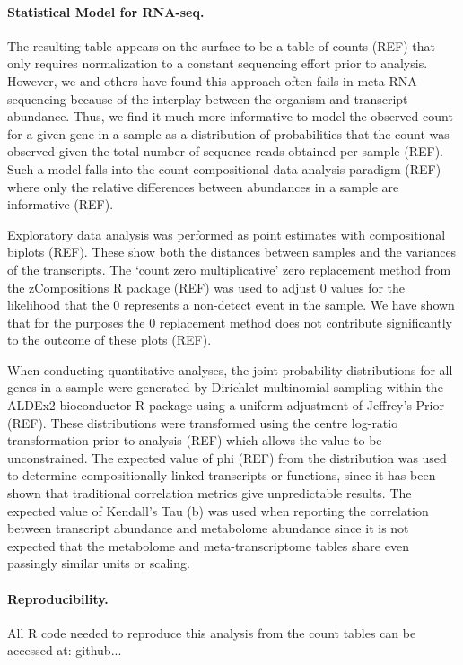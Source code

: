 \documentclass[10pt,letterpaper]{article}
\begin{document}
\paragraph{Statistical Model for RNA-seq.} The resulting table appears on the surface to be a table of counts (REF) that only requires normalization to a constant sequencing effort prior to analysis. However, we and others have found this approach often fails in meta-RNA sequencing because of the interplay between the organism and transcript abundance. Thus, we find it much more informative to model the observed count for a given gene in a sample as a distribution of probabilities that the count was observed given the total number of sequence reads obtained per sample (REF). Such a model falls into the count compositional data analysis paradigm (REF) where only the relative differences between abundances in a sample are informative (REF). 

Exploratory data analysis was performed as point estimates with compositional biplots (REF). These show both the distances between samples and the variances of the transcripts. The `count zero multiplicative' zero replacement method from the zCompositions R package (REF) was used to adjust 0 values for the likelihood that the 0 represents a non-detect event in the sample. We have shown that for the purposes the 0 replacement method does not contribute significantly to the outcome of these plots (REF). 

When conducting quantitative analyses, the joint probability distributions for all genes in a sample were generated by Dirichlet multinomial sampling within the ALDEx2 bioconductor R package using a uniform adjustment of Jeffrey's Prior (REF). These distributions were transformed using the centre log-ratio transformation  prior to analysis (REF) which allows the value to be unconstrained. The expected value of phi (REF) from the distribution was used to determine compositionally-linked transcripts or functions, since it has been shown that traditional correlation metrics give unpredictable results. The expected value of Kendall's Tau (b) was used when reporting the correlation between transcript abundance and metabolome abundance since it is not expected that the metabolome and meta-transcriptome tables share even passingly similar units or scaling. 

\paragraph{Reproducibility.} All R code needed to reproduce this analysis from the count tables can be accessed at: github...
\end{document}
